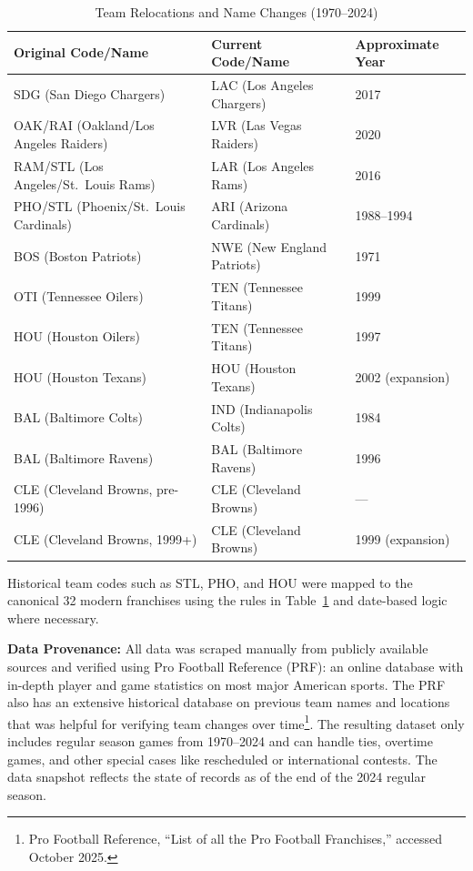 \documentclass[a4paper,10.5pt,twoside]{article}
\begin{document}
\begin{table}[htbp]
\centering
\caption{Team Relocations and Name Changes (1970--2024)}
\label{tab:team_relocations}
\begin{tabular}{lll}
\hline
\textbf{Original Code/Name} & \textbf{Current Code/Name} & \textbf{Approximate Year} \\
\hline
SDG (San Diego Chargers) & LAC (Los Angeles Chargers) & 2017 \\
OAK/RAI (Oakland/Los Angeles Raiders) & LVR (Las Vegas Raiders) & 2020 \\
RAM/STL (Los Angeles/St.\ Louis Rams) & LAR (Los Angeles Rams) & 2016 \\
PHO/STL (Phoenix/St.\ Louis Cardinals) & ARI (Arizona Cardinals) & 1988--1994 \\
BOS (Boston Patriots) & NWE (New England Patriots) & 1971 \\
OTI (Tennessee Oilers) & TEN (Tennessee Titans) & 1999 \\
HOU (Houston Oilers) & TEN (Tennessee Titans) & 1997 \\
HOU (Houston Texans) & HOU (Houston Texans) & 2002 (expansion) \\
BAL (Baltimore Colts) & IND (Indianapolis Colts) & 1984 \\
BAL (Baltimore Ravens) & BAL (Baltimore Ravens) & 1996 \\
CLE (Cleveland Browns, pre-1996) & CLE (Cleveland Browns) & --- \\
CLE (Cleveland Browns, 1999+) & CLE (Cleveland Browns) & 1999 (expansion) \\
\hline
\end{tabular}
\end{table}


Historical team codes such as STL, PHO, and HOU were mapped to the canonical 32 modern franchises using the rules in Table~\ref{tab:team_relocations} and date-based logic where necessary.

\textbf{Data Provenance:} All data was scraped manually from publicly available sources and verified using Pro Football Reference (PRF): an online database with in-depth player and game statistics on most major American sports. The PRF also has an extensive historical database on previous team names and locations that was helpful for verifying team changes over time\footnote{Pro Football Reference, “List of all the Pro Football Franchises,” accessed October 2025.}. The resulting dataset only includes regular season games from 1970--2024 and can handle ties, overtime games, and other special cases like rescheduled or international contests. The data snapshot reflects the state of records as of the end of the 2024 regular season.
\end{document}
